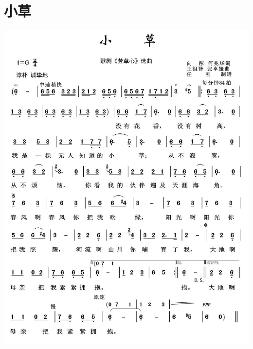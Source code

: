 \documentclass[cn,pad,twocol]{elegantbook}
\begin{document}
\section{小草}                  \includegraphics[width=\textwidth]{rpi400/20210131小草.jpeg}
\end{document}
